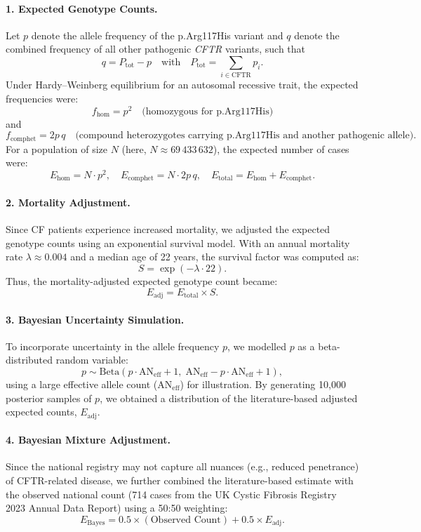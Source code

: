 \paragraph{1. Expected Genotype Counts.}
Let \( p \) denote the allele frequency of the p.Arg117His variant and \( q \) denote the combined frequency of all other pathogenic \textit{CFTR} variants, such that
\[
q = P_{\text{tot}} - p \quad \text{with} \quad P_{\text{tot}} = \sum_{i \in \text{CFTR}} p_i.
\]
Under Hardy–Weinberg equilibrium for an autosomal recessive trait, the expected frequencies were:
\[
f_{\text{hom}} = p^2 \quad \text{(homozygous for p.Arg117His)}
\]
and
\[
f_{\text{comphet}} = 2p\,q \quad \text{(compound heterozygotes carrying p.Arg117His and another pathogenic allele)}.
\]
For a population of size \( N \) (here, \( N \approx 69\,433\,632 \)), the expected number of cases were:
\[
E_{\text{hom}} = N \cdot p^2,\quad E_{\text{comphet}} = N \cdot 2p\,q,\quad E_{\text{total}} = E_{\text{hom}} + E_{\text{comphet}}.
\]

\paragraph{2. Mortality Adjustment.}
Since CF patients experience increased mortality, we adjusted the expected genotype counts using an exponential survival model. With an annual mortality rate \(\lambda \approx 0.004\) and a median age of 22 years, the survival factor was computed as:
\[
S = \exp(-\lambda \cdot 22).
\]
Thus, the mortality-adjusted expected genotype count became:
\[
E_{\text{adj}} = E_{\text{total}} \times S.
\]

\paragraph{3. Bayesian Uncertainty Simulation.}
To incorporate uncertainty in the allele frequency \( p \), we modelled \( p \) as a beta-distributed random variable:
\[
p \sim \mathrm{Beta}(p \cdot \text{AN}_{\text{eff}} + 1,\; \text{AN}_{\text{eff}} - p \cdot \text{AN}_{\text{eff}} + 1),
\]
using a large effective allele count (\(\text{AN}_{\text{eff}}\)) for illustration. By generating 10,000 posterior samples of \( p \), we obtained a distribution of the literature-based adjusted expected counts, \(E_{\text{adj}}\).

\paragraph{4. Bayesian Mixture Adjustment.}
Since the national registry may not capture all nuances (e.g., reduced penetrance) of CFTR-related disease, we further combined the literature-based estimate with the observed national count (714 cases from the UK Cystic Fibrosis Registry 2023 Annual Data Report) using a 50:50 weighting:
\[
E_{\text{Bayes}} = 0.5 \times (\text{Observed Count}) + 0.5 \times E_{\text{adj}}.
\]

